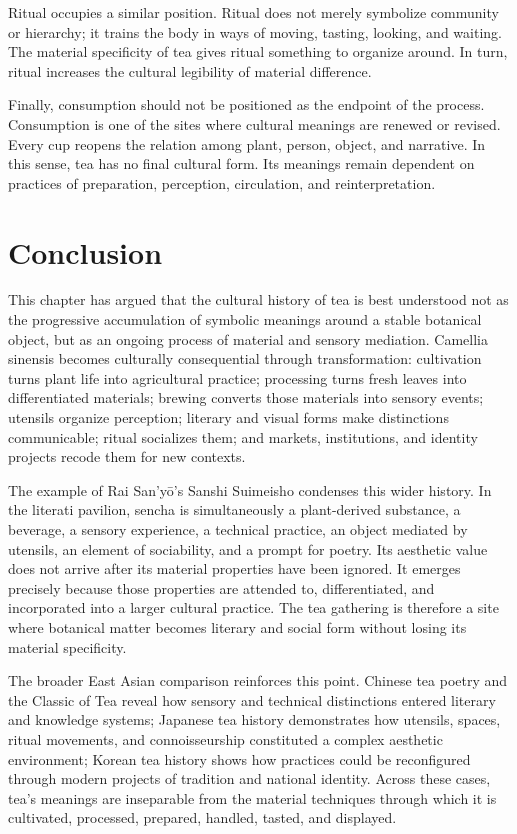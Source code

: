 \documentclass[11pt,a4paper]{article}
\begin{document}
Ritual occupies a similar position. Ritual does not merely symbolize community or hierarchy; it trains the body in ways of moving, tasting, looking, and waiting. The material specificity of tea gives ritual something to organize around. In turn, ritual increases the cultural legibility of material difference.

Finally, consumption should not be positioned as the endpoint of the process. Consumption is one of the sites where cultural meanings are renewed or revised. Every cup reopens the relation among plant, person, object, and narrative. In this sense, tea has no final cultural form. Its meanings remain dependent on practices of preparation, perception, circulation, and reinterpretation.

\section{Conclusion}

This chapter has argued that the cultural history of tea is best understood not as the progressive accumulation of symbolic meanings around a stable botanical object, but as an ongoing process of material and sensory mediation. Camellia sinensis becomes culturally consequential through transformation: cultivation turns plant life into agricultural practice; processing turns fresh leaves into differentiated materials; brewing converts those materials into sensory events; utensils organize perception; literary and visual forms make distinctions communicable; ritual socializes them; and markets, institutions, and identity projects recode them for new contexts.

The example of Rai San'yō's Sanshi Suimeisho condenses this wider history. In the literati pavilion, sencha is simultaneously a plant-derived substance, a beverage, a sensory experience, a technical practice, an object mediated by utensils, an element of sociability, and a prompt for poetry. Its aesthetic value does not arrive after its material properties have been ignored. It emerges precisely because those properties are attended to, differentiated, and incorporated into a larger cultural practice. The tea gathering is therefore a site where botanical matter becomes literary and social form without losing its material specificity.

The broader East Asian comparison reinforces this point. Chinese tea poetry and the Classic of Tea reveal how sensory and technical distinctions entered literary and knowledge systems; Japanese tea history demonstrates how utensils, spaces, ritual movements, and connoisseurship constituted a complex aesthetic environment; Korean tea history shows how practices could be reconfigured through modern projects of tradition and national identity. Across these cases, tea's meanings are inseparable from the material techniques through which it is cultivated, processed, prepared, handled, tasted, and displayed.
\end{document}
